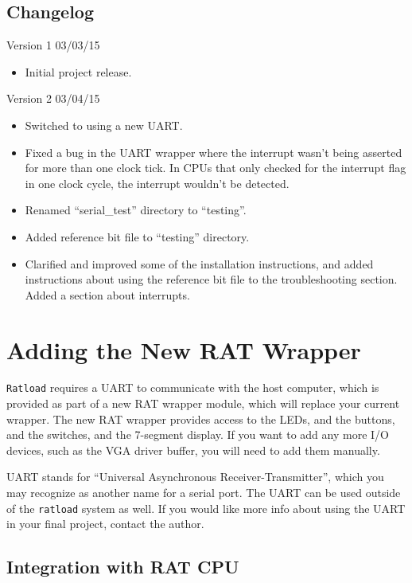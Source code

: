 \documentclass[notitlepage]{article}
\newcommand{\infosign}{\fontencoding{U}\fontfamily{futs}\huge\selectfont\char 116\relax}
\begin{document}
\subsection{Changelog}
Version 1 03/03/15
\begin{itemize}
  \item Initial project release.
\end{itemize}
Version 2 03/04/15
\begin{itemize}
\item Switched to using a new UART.
\item Fixed a bug in the UART wrapper where the interrupt wasn't being asserted for more than one clock tick. In CPUs that only checked for the interrupt flag in one clock cycle, the interrupt wouldn't be detected.
\item Renamed ``serial\_test'' directory to ``testing''.
\item Added reference bit file to ``testing'' directory.
\item Clarified and improved some of the installation instructions, and added instructions about using the reference bit file to the troubleshooting section. Added a section about interrupts.
\end{itemize}

\section{Adding the New RAT Wrapper}
\texttt{Ratload} requires a UART to communicate with the host computer, which is provided as part of a new RAT wrapper module, which will replace your current wrapper. The new RAT wrapper provides access to the LEDs, and the buttons, and the switches, and the 7-segment display. If you want to add any more I/O devices, such as the VGA driver buffer, you will need to add them manually.

\begin{infobox}
  {\infosign} UART stands for ``Universal Asynchronous Receiver-Transmitter'', which you may recognize as another name for a serial port. The UART can be used outside of the \texttt{ratload} system as well. If you would like more info about using the UART in your final project, contact the author.
\end{infobox}

\subsection{Integration with RAT CPU}
\end{document}
